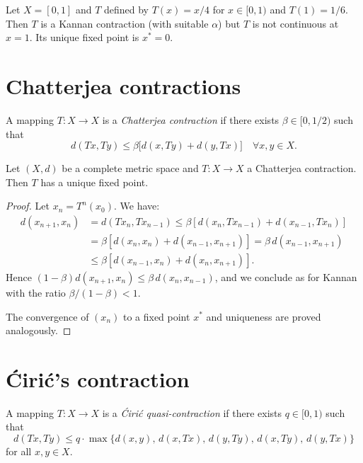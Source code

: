\begin{example}
Let $X = [0, 1]$ and $T$ defined by $T(x) = x/4$ for $x \in [0, 1)$ and
$T(1) = 1/6$. Then $T$ is a Kannan contraction (with suitable $\alpha$) but $T$
is not continuous at $x = 1$. Its unique fixed point is $x^* = 0$.
\end{example}

\section{Chatterjea contractions}

\begin{definition}
A mapping $T : X \to X$ is a \emph{Chatterjea contraction} if there exists
$\beta \in [0, 1/2)$ such that
\[
    d(Tx, Ty) \leq \beta \bigl[ d(x, Ty) + d(y, Tx) \bigr] \quad \forall x, y \in X.
\]
\end{definition}

\begin{theorem}[Chatterjea, 1972]
Let $(X, d)$ be a complete metric space and $T : X \to X$ a Chatterjea
contraction. Then $T$ has a unique fixed point.
\end{theorem}

\begin{proof}
Let $x_n = T^n(x_0)$. We have:
\begin{align*}
    d(x_{n+1}, x_n) &= d(Tx_n, Tx_{n-1})
    \leq \beta[d(x_n, Tx_{n-1}) + d(x_{n-1}, Tx_n)] \\
    &= \beta[d(x_n, x_n) + d(x_{n-1}, x_{n+1})]
    = \beta \, d(x_{n-1}, x_{n+1}) \\
    &\leq \beta[d(x_{n-1}, x_n) + d(x_n, x_{n+1})].
\end{align*}
Hence $(1 - \beta) d(x_{n+1}, x_n) \leq \beta \, d(x_n, x_{n-1})$, and we
conclude as for Kannan with the ratio $\beta/(1-\beta) < 1$.

The convergence of $(x_n)$ to a fixed point $x^*$ and uniqueness are proved
analogously.
\end{proof}

\section{\'Ciri\'c's contraction}

\begin{definition}
A mapping $T : X \to X$ is a \emph{\'Ciri\'c quasi-contraction} if there exists
$q \in [0, 1)$ such that
\[
    d(Tx, Ty) \leq q \cdot \max\{d(x,y),\, d(x, Tx),\, d(y, Ty),\, d(x, Ty),\, d(y, Tx)\}
\]
for all $x, y \in X$.
\end{definition}


